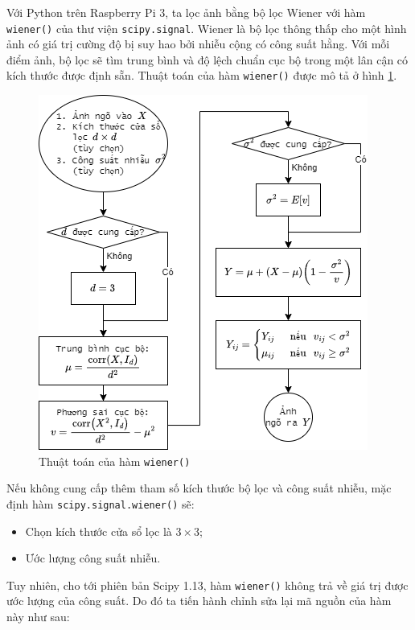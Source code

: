 Với Python trên Raspberry Pi 3, ta lọc ảnh bằng bộ lọc Wiener với hàm \texttt{wiener()} của thư viện \texttt{scipy.signal}. 
Wiener là bộ lọc thông thấp cho một hình ảnh có giá trị cường độ bị suy hao bởi nhiễu cộng có công suất hằng. 
Với mỗi điểm ảnh, bộ lọc sẽ tìm trung bình và độ lệch chuẩn cục bộ trong một lân cận có kích thước được định sẵn.
Thuật toán của hàm \texttt{wiener()} được mô tả ở hình \ref{fig:wiener_algorithm}.

\begin{figure}[H]
    \centering
    \includegraphics[width=.75\linewidth]{../images/wiener_algorithm.png}
    \caption{Thuật toán của hàm \texttt{wiener()}}
    \label{fig:wiener_algorithm}
\end{figure}

Nếu không cung cấp thêm tham số kích thước bộ lọc và công suất nhiễu,
mặc định hàm \texttt{scipy.signal.wiener()} sẽ:
\begin{itemize}
    \item Chọn kích thước cửa sổ lọc là $3 \times 3$;
    \item Ước lượng công suất nhiễu.
\end{itemize}

Tuy nhiên, cho tới phiên bản Scipy 1.13, hàm \texttt{wiener()} không trả về giá trị được ước lượng của công suất.
Do đó ta tiến hành chỉnh sửa lại mã nguồn của hàm này như sau:

